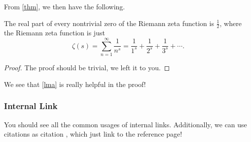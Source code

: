 From \autoref{thm}, we then have the following.
\begin{corollary}\label{col}
  The real part of every nontrivial zero of the Riemann zeta function is \(\frac{1}{2}\), where the Riemann zeta function is just
  \[
    \zeta (s)=\sum _{n=1}^{\infty }{\frac {1}{n^{s}}}={\frac {1}{1^{s}}}+{\frac {1}{2^{s}}}+{\frac {1}{3^{s}}}+\cdots.
  \]
\end{corollary}
\begin{proof}
  The proof should be trivial, we left it to you.
\end{proof}
\begin{prev}
  We see that \autoref{lma} is really helpful in the proof!
\end{prev}

\subsubsection{Internal Link}
You should see all the common usages of internal links. 
Additionally, we can use citations as citation \cite{nielsen2001quantum}, which just link to the reference page!


